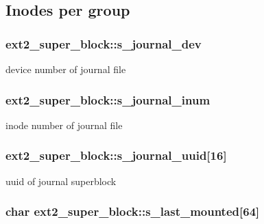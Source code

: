 \subsection*{Inodes per group}\hypertarget{structext2__super__block_a5c65ec434f4b1394d6ec68fb8d055a4e}{
\subsubsection[{s\+\_\+journal\+\_\+dev}]{ ext2\+\_\+super\+\_\+block\+::s\+\_\+journal\+\_\+dev}}\label{structext2__super__block_a5c65ec434f4b1394d6ec68fb8d055a4e}
device number of journal file \hypertarget{structext2__super__block_a593535b5ffb1b5480f887e0aae0be698}{
\subsubsection[{s\+\_\+journal\+\_\+inum}]{ ext2\+\_\+super\+\_\+block\+::s\+\_\+journal\+\_\+inum}}\label{structext2__super__block_a593535b5ffb1b5480f887e0aae0be698}
inode number of journal file \hypertarget{structext2__super__block_a31f78875053afe2073c72ab700e831cd}{
\subsubsection[{s\+\_\+journal\+\_\+uuid}]{ ext2\+\_\+super\+\_\+block\+::s\+\_\+journal\+\_\+uuid\mbox{[}16\mbox{]}}}\label{structext2__super__block_a31f78875053afe2073c72ab700e831cd}
uuid of journal superblock \hypertarget{structext2__super__block_ad2849dfeab713d00ddd93c97eaf80cea}{
\subsubsection[{s\+\_\+last\+\_\+mounted}]{\setlength{\rightskip}{0pt plus 5cm}char ext2\+\_\+super\+\_\+block\+::s\+\_\+last\+\_\+mounted\mbox{[}64\mbox{]}}}\label{structext2__super__block_ad2849dfeab713d00ddd93c97eaf80cea}
